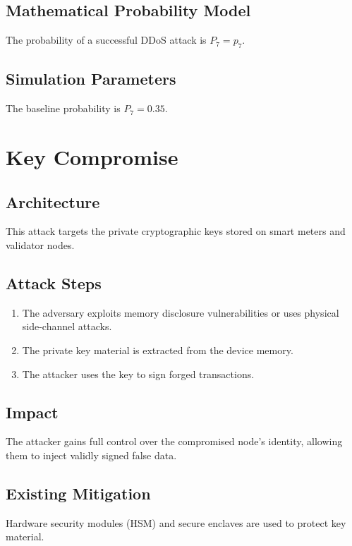 \documentclass[12pt, oneside, a4paper]{report}
\theoremstyle{definition}
\theoremstyle{remark}
\begin{document}
\subsection{Mathematical Probability Model}
The probability of a successful DDoS attack is $P_7 = p_7$.

\subsection{Simulation Parameters}
The baseline probability is $P_7 = 0.35$.

\bigskip

\section{Key Compromise}
\label{sec:tm:key_compromise}

\subsection{Architecture}
This attack targets the private cryptographic keys stored on smart meters and validator nodes.

\subsection{Attack Steps}
\begin{enumerate}
  \item The adversary exploits memory disclosure vulnerabilities or uses physical side-channel attacks.
  \item The private key material is extracted from the device memory.
  \item The attacker uses the key to sign forged transactions.
\end{enumerate}

\subsection{Impact}
The attacker gains full control over the compromised node's identity, allowing them to inject validly signed false data.

\subsection{Existing Mitigation}
Hardware security modules (HSM) and secure enclaves are used to protect key material.
\end{document}
